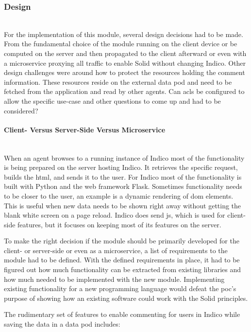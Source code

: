 \subsubsection{Design}\label{subsubsection:design}\mbox{}\\

For the implementation of this module, several design decisions had to be made. From the fundamental choice of the module running on the client device or be computed on the server and then propagated to the client afterward or even with a microservice proxying all traffic to enable Solid without changing Indico.
Other design challenges were around how to protect the resources holding the comment information. These resources reside on the external data pod and need to be fetched from the application and read by other agents. Can \glspl{acl} be configured to allow the specific use-case and other questions to come up and had to be considered?

\paragraph{Client- Versus Server-Side Versus Microservice}\mbox{}\\

When an agent browses to a running instance of Indico most of the functionality is being prepared on the server hosting Indico. It retrieves the specific request, builds the \gls{html}, and sends it to the user. For Indico most of the functionality is built with Python and the web framework Flask. Sometimes functionality needs to be closer to the user, an example is a dynamic rendering of \gls{dom} elements. This is useful when new data needs to be shown right away without getting the blank white screen on a page reload.
Indico does send \gls{js}, which is used for client-side features, but it focuses on keeping most of its features on the server.

To make the right decision if the module should be primarily developed for the client- or server-side or even as a microservice, a list of requirements to the module had to be defined. With the defined requirements in place, it had to be figured out how much functionality can be extracted from existing libraries and how much needed to be implemented with the new module. Implementing existing functionality for a new programming language would defeat the \gls{poc}’s purpose of showing how an existing software could work with the Solid principles.

The rudimentary set of features to enable commenting for users in Indico while saving the data in a data pod includes: 


